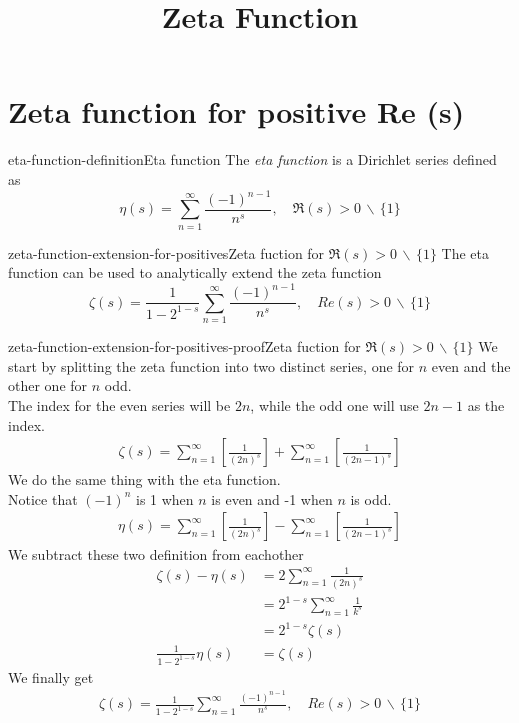 \documentclass[preview]{standalone}
\newcommand{\exceptone}{
    \,\backslash\,\{1\}
}
\begin{document}
\title{Zeta Function}
\genpage

\section{Zeta function for positive Re (s)}

\begin{snippetdefinition}{eta-function-definition}{Eta function}
    The \textit{eta function} is a Dirichlet series defined as
    \[
        \eta(s)=\sum_{n=1}^{\infty}\frac{{(-1)}^{n-1}}{n^s},
        \quad \Re(s)>0\exceptone
    \]
\end{snippetdefinition}

\begin{snippettheorem}{zeta-function-extension-for-positives}{Zeta fuction for \(\Re(s) > 0 \exceptone\)}
    The eta function can be used to analytically extend the zeta function
    \[
        \zeta(s)=\frac{1}{1-2^{1-s}}\sum_{n=1}^{\infty}\frac{{(-1)}^{n-1}}{n^s},
        \quad Re(s)>0\exceptone
    \]
\end{snippettheorem}

\begin{snippetproof}{zeta-function-extension-for-positives-proof}{Zeta fuction for \(\Re(s) > 0 \exceptone\)}
    We start by splitting the zeta function into two distinct series, one for \(n\) even and the other one for \(n\) odd.
    \\
    The index for the even series will be \(2n\), while the odd one will use \(2n-1\) as the index.
    \begin{align*}
        \zeta(s)=
        \sum_{n=1}^{\infty}\left[\frac{1}{{(2n)}^s}\right]+
        \sum_{n=1}^{\infty}\left[\frac{1}{{(2n-1)}^s}\right]
    \end{align*}
    We do the same thing with the eta function.
    \\
    Notice that \({(-1)}^n\) is 1 when \(n\) is even and -1 when \(n\) is odd.
    \begin{align*}
        \eta(s)=
        \sum_{n=1}^{\infty}\left[\frac{1}{{(2n)}^s}\right]-
        \sum_{n=1}^{\infty}\left[\frac{1}{{(2n-1)}^s}\right]
    \end{align*}
    We subtract these two definition from eachother
    \begin{align*}
        \zeta(s)-\eta(s)&=
        2\sum_{n=1}^{\infty}\frac{1}{{(2n)}^s}
        \\
        &=2^{1-s}\sum_{n=1}^{\infty}\frac{1}{k^s}
        \\
        &=2^{1-s}\zeta(s)
        \\
        \frac{1}{1-2^{1-s}}\eta(s)&=\zeta(s)
    \end{align*}
    We finally get
    \begin{align*}
        \zeta(s)=\frac{1}{1-2^{1-s}}\sum_{n=1}^{\infty}\frac{{(-1)}^{n-1}}{n^s},
        \quad Re(s)>0\exceptone
    \end{align*}
\end{snippetproof}
\end{document}
